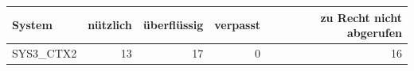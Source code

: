 \begin{tabular}{lrrrr}
\toprule
System & nützlich & überflüssig & verpasst & zu Recht nicht abgerufen \\
\midrule
SYS3\_CTX2 & 13 & 17 & 0 & 16 \\
\bottomrule
\end{tabular}
